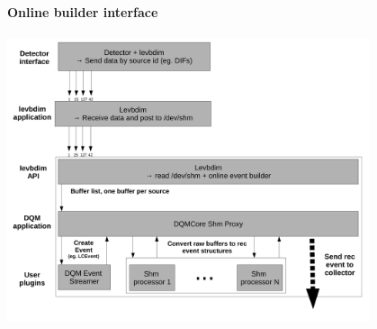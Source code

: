 \documentclass[8pt]{beamer}
\begin{document}
  \begin{frame}[containsverbatim]
    \frametitle{\secname}
    \framesubtitle{Online builder interface}

    \begin{center}
      \includegraphics[width=0.8\textwidth]{figs/DQMeventbuilder.pdf}
    \end{center}

  \end{frame}
\end{document}
